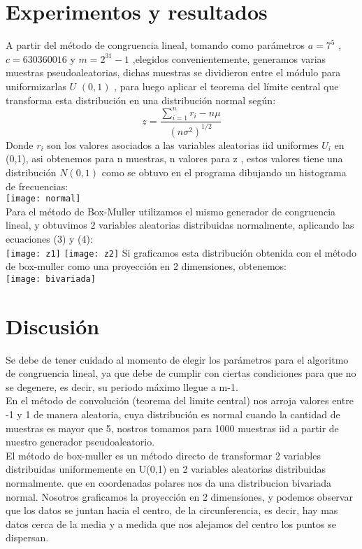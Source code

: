 \documentclass[conference,a4paper]{IEEEtran}
\begin{document}
\section{\textbf{Experimentos y resultados}}
A partir del m\'etodo de congruencia lineal, tomando como par\'ametros $a = 7^{5}$ , $c = 630360016$ y $m = 2^{31}-1$ ,elegidos convenientemente, generamos varias muestras pseudoaleatorias, dichas muestras se dividieron entre el m\'odulo para uniformizarlas  $U$ $(0,1)$ , para luego aplicar el teorema del l\'imite central que transforma esta distribuci\'on en una distribuci\'on normal seg\'un:\\
\begin{equation}
 z = \frac{\sum_{i=1}^{n}r_{i}  - n\mu}{(n\sigma^{2})^{1/2}}
\end{equation}
Donde $r_{i}$ son los valores asociados a las variables aleatorias iid uniformes $U_{i}$ en (0,1), asi obtenemos para n muestras, n valores para z , estos valores tiene una distribuci\'on  $N(0,1)$ como se obtuvo en el programa dibujando un histograma de frecuencias:\\
\texttt{[image: normal]}\\
Para el m\'etodo de Box-Muller utilizamos el mismo generador de congruencia lineal, y obtuvimos 2 variables aleatorias distribuidas normalmente, aplicando las ecuaciones (3) y (4):\\
\texttt{[image: z1]}  
\texttt{[image: z2]}
Si graficamos esta distribuci\'on obtenida con el m\'etodo de box-muller como una proyecci\'on en 2 dimensiones, obtenemos:\\
\texttt{[image: bivariada]}
\section{Discusi\'on}
Se debe de tener cuidado al momento de elegir los par\'ametros para el algoritmo de congruencia lineal, ya que debe de cumplir con ciertas condiciones para que no se degenere, es decir, su periodo m\'aximo llegue a m-1.\\

En el m\'etodo de convoluci\'on (teorema del limite central)  nos arroja valores entre -1 y 1 de manera aleatoria, cuya distribuci\'on es normal cuando la cantidad de muestras es mayor que 5, nostros tomamos para 1000 muestras iid a partir de nuestro generador pseudoaleatorio.\\

El m\'etodo de box-muller es un m\'etodo directo de transformar 2 variables distribuidas uniformemente en U(0,1)
en 2 variables aleatorias distribuidas normalmente. que en coordenadas polares nos da una distribucion bivariada normal. Nosotros graficamos la proyecci\'on en 2 dimensiones, y podemos observar que los datos se juntan hacia el centro, de la circunferencia, es decir, hay mas datos cerca de la media  y a medida que nos alejamos del centro los puntos se dispersan.\\
\end{document}
